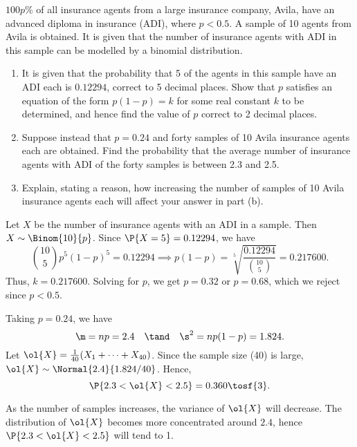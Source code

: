 \begin{problem}
    $100p$\% of all insurance agents from a large insurance company, Avila, have an advanced diploma in insurance (ADI), where $p<0.5$. A sample of 10 agents from Avila is obtained. It is given that the number of insurance agents with ADI in this sample can be modelled by a binomial distribution.

    \begin{enumerate}
        \item It is given that the probability that 5 of the agents in this sample have an ADI each is $0.12294$, correct to 5 decimal places. Show that $p$ satisfies an equation of the form $p(1-p)=k$ for some real constant $k$ to be determined, and hence find the value of $p$ correct to 2 decimal places.
        \item Suppose instead that $p=0.24$ and forty samples of 10 Avila insurance agents each are obtained. Find the probability that the average number of insurance agents with ADI of the forty samples is between 2.3 and 2.5.
        \item Explain, stating a reason, how increasing the number of samples of 10 Avila insurance agents each will affect your answer in part (b).
    \end{enumerate}
\end{problem}
\begin{solution}
    \begin{ppart}
        Let $X$ be the number of insurance agents with an ADI in a sample. Then $X \sim \Binom{10}{p}$. Since $\P{X = 5} = 0.12294$, we have \[\binom{10}{5} p^5 (1-p)^5 = 0.12294 \implies p(1-p) = \sqrt[5]{\frac{0.12294}{\binom{10}{5}}} = 0.217600.\] Thus, $k = 0.217600$. Solving for $p$, we get $p = 0.32$ or $p = 0.68$, which we reject since $p < 0.5$.
    \end{ppart}
    \begin{ppart}
        Taking $p = 0.24$, we have \[\m = np = 2.4 \quad \tand \quad \s^2 = np(1-p) = 1.824.\] Let $\ol{X} = \frac1{40} (X_1 + \dots + X_{40})$. Since the sample size (40) is large, $\ol{X} \sim \Normal{2.4}{1.824/40}$. Hence, \[\P{2.3 < \ol{X} < 2.5} = 0.360 \tosf{3}.\]
    \end{ppart}
    \begin{ppart}
        As the number of samples increases, the variance of $\ol{X}$ will decrease. The distribution of $\ol{X}$ becomes more concentrated around $2.4$, hence $\P{2.3 < \ol{X} < 2.5}$ will tend to 1.
    \end{ppart}
\end{solution}

